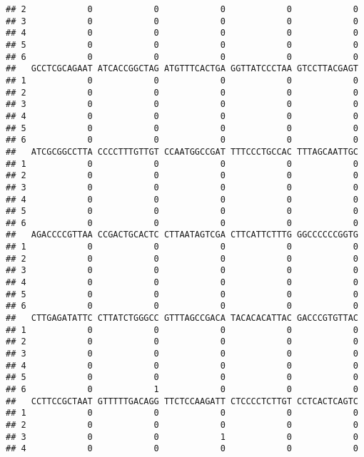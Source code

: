 \documentclass[]{article}
\begin{document}
\begin{verbatim}
## 2            0            0            0            0            0
## 3            0            0            0            0            0
## 4            0            0            0            0            0
## 5            0            0            0            0            0
## 6            0            0            0            0            0
##   GCCTCGCAGAAT ATCACCGGCTAG ATGTTTCACTGA GGTTATCCCTAA GTCCTTACGAGT
## 1            0            0            0            0            0
## 2            0            0            0            0            0
## 3            0            0            0            0            0
## 4            0            0            0            0            0
## 5            0            0            0            0            0
## 6            0            0            0            0            0
##   ATCGCGGCCTTA CCCCTTTGTTGT CCAATGGCCGAT TTTCCCTGCCAC TTTAGCAATTGC
## 1            0            0            0            0            0
## 2            0            0            0            0            0
## 3            0            0            0            0            0
## 4            0            0            0            0            0
## 5            0            0            0            0            0
## 6            0            0            0            0            0
##   AGACCCCGTTAA CCGACTGCACTC CTTAATAGTCGA CTTCATTCTTTG GGCCCCCCGGTG
## 1            0            0            0            0            0
## 2            0            0            0            0            0
## 3            0            0            0            0            0
## 4            0            0            0            0            0
## 5            0            0            0            0            0
## 6            0            0            0            0            0
##   CTTGAGATATTC CTTATCTGGGCC GTTTAGCCGACA TACACACATTAC GACCCGTGTTAC
## 1            0            0            0            0            0
## 2            0            0            0            0            0
## 3            0            0            0            0            0
## 4            0            0            0            0            0
## 5            0            0            0            0            0
## 6            0            1            0            0            0
##   CCTTCCGCTAAT GTTTTTGACAGG TTCTCCAAGATT CTCCCCTCTTGT CCTCACTCAGTC
## 1            0            0            0            0            0
## 2            0            0            0            0            0
## 3            0            0            1            0            0
## 4            0            0            0            0            0

\end{verbatim}
\end{document}
